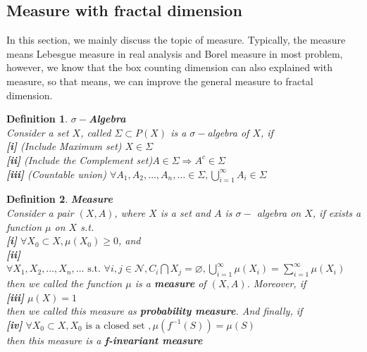 \documentclass[12pt]{article}
\theoremstyle{plain}
\newtheorem{definition}{{\color{red}\textbf{Definition}}}[section]
\begin{document}
\subsection{Measure with fractal dimension}

In this section, we mainly discuss the topic of measure. Typically, the measure means Lebesgue measure in real analysis and Borel measure in most problem, however, we know that the box counting dimension can also explained with measure, so that means, we can improve the general measure to fractal dimension. 



\begin{definition}\label{sigma_algebra}\textbf{$\sigma - $Algebra}
\\\noindent Consider a set $X$, called $\Sigma\subset P(X)$ is a $\sigma -$algebra of $X$, if
\\\noindent \textbf{[i]} (Include Maximum set) $X \in \Sigma$
\\\noindent \textbf{[ii]} (Include the Complement set)$A\in \Sigma \Rightarrow A^c \in \Sigma$
\\\noindent \textbf{[iii]} (Countable union) $\forall A_1, A_2, \ldots, A_n, \ldots \in \Sigma, \bigcup_{i = 1}^{\infty} A_i\in \Sigma$
\end{definition}



\begin{definition}\textbf{Measure}
\\          Consider a pair $(X, A)$, where $X$ is a set and $A$ is $\sigma - $ algebra on $X$, if exists a function $\mu$ on $X$ s.t.
\\\noindent \textbf{[i]} $\forall X_0 \subset X, \mu(X_0) \geq 0$, and
\\\noindent \textbf{[ii]} $\forall X_1, X_2, \ldots, X_n, \ldots \text{ s.t. } \forall i, j \in \mathcal N, C_i \bigcap X_j = \varnothing, \bigcup_{i = 1}^{\infty}\mu(X_i) = \sum_{i = 1}^{\infty}\mu(X_i)$
\\          then we called the function $\mu$ is a \textbf{measure} of $(X, A)$. Moreover, if
\\\noindent \textbf{[iii]} $\mu(X) = 1$
\\          then we called this measure as \textbf{probability measure}. And finally, if
\\\noindent \textbf{[iv]} $\forall X_0 \subset X, X_0 \text{ is a closed set }, \mu(f^{-1}(S)) = \mu(S)$
\\          then this measure is a \textbf{f-invariant measure}
\end{definition}
\end{document}
